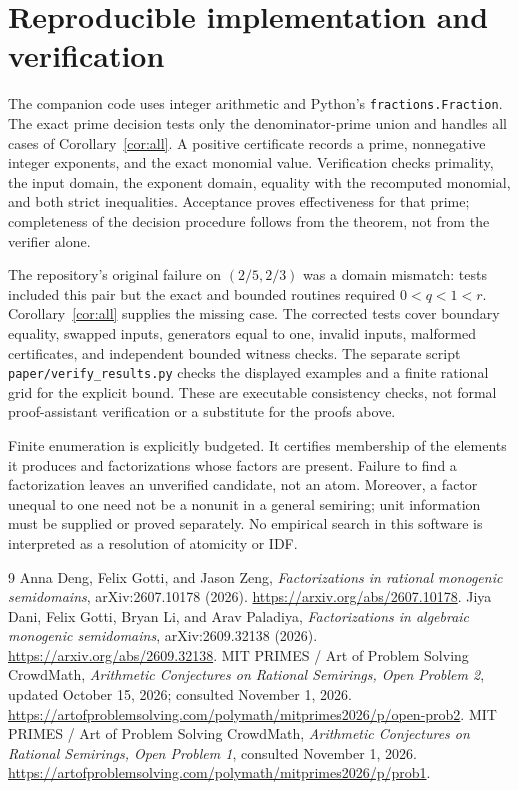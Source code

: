 \documentclass[11pt]{article}
\theoremstyle{definition}
\begin{document}
\section{Reproducible implementation and verification}
The companion code uses integer arithmetic and Python's
\texttt{fractions.Fraction}. The exact prime decision tests only the
denominator-prime union and handles all cases of Corollary~\ref{cor:all}.
A positive certificate records a prime, nonnegative integer exponents,
and the exact monomial value. Verification checks primality, the input
domain, the exponent domain, equality with the recomputed monomial, and
both strict inequalities. Acceptance proves effectiveness for that
prime; completeness of the decision procedure follows from the theorem,
not from the verifier alone.

The repository's original failure on $(2/5,2/3)$ was a domain mismatch:
tests included this pair but the exact and bounded routines required
$0<q<1<r$. Corollary~\ref{cor:all} supplies the missing case. The
corrected tests cover boundary equality, swapped inputs, generators equal
to one, invalid inputs, malformed certificates, and independent bounded
witness checks. The separate script \texttt{paper/verify\_results.py}
checks the displayed examples and a finite rational grid for the explicit
bound. These are executable consistency checks, not formal proof-assistant
verification or a substitute for the proofs above.

Finite enumeration is explicitly budgeted. It certifies membership of
the elements it produces and factorizations whose factors are present.
Failure to find a factorization leaves an unverified candidate, not an
atom. Moreover, a factor unequal to one need not be a nonunit in a general
semiring; unit information must be supplied or proved separately.
No empirical search in this software is interpreted as a resolution of
atomicity or IDF.

\begin{thebibliography}{9}
Anna Deng, Felix Gotti, and Jason Zeng,
\emph{Factorizations in rational monogenic semidomains},
arXiv:2607.10178 (2026).
\url{https://arxiv.org/abs/2607.10178}.
Jiya Dani, Felix Gotti, Bryan Li, and Arav Paladiya,
\emph{Factorizations in algebraic monogenic semidomains},
arXiv:2609.32138 (2026).
\url{https://arxiv.org/abs/2609.32138}.
MIT PRIMES / Art of Problem Solving CrowdMath,
\emph{Arithmetic Conjectures on Rational Semirings, Open Problem 2},
updated October 15, 2026; consulted November 1, 2026.
\url{https://artofproblemsolving.com/polymath/mitprimes2026/p/open-prob2}.
MIT PRIMES / Art of Problem Solving CrowdMath,
\emph{Arithmetic Conjectures on Rational Semirings, Open Problem 1},
consulted November 1, 2026.
\url{https://artofproblemsolving.com/polymath/mitprimes2026/p/prob1}.
\end{thebibliography}
\end{document}
